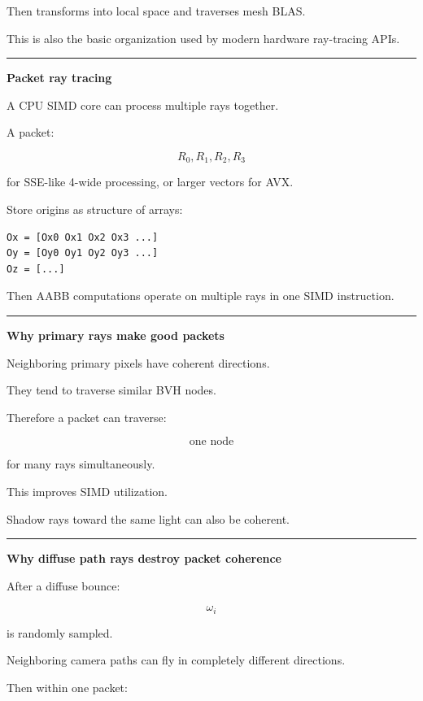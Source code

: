 Then transforms into local space and traverses mesh BLAS.

This is also the basic organization used by modern hardware ray-tracing APIs.

\begin{center}\rule{0.5\linewidth}{0.5pt}\end{center}

\textbf{Packet ray tracing}

A CPU SIMD core can process multiple rays together.

A packet:

\[
R_0,R_1,R_2,R_3
\]

for SSE-like 4-wide processing, or larger vectors for AVX.

Store origins as structure of arrays:

\begin{verbatim}
Ox = [Ox0 Ox1 Ox2 Ox3 ...]
Oy = [Oy0 Oy1 Oy2 Oy3 ...]
Oz = [...]
\end{verbatim}

Then AABB computations operate on multiple rays in one SIMD instruction.

\begin{center}\rule{0.5\linewidth}{0.5pt}\end{center}

\textbf{Why primary rays make good packets}

Neighboring primary pixels have coherent directions.

They tend to traverse similar BVH nodes.

Therefore a packet can traverse:

\[
\text{one node}
\]

for many rays simultaneously.

This improves SIMD utilization.

Shadow rays toward the same light can also be coherent.

\begin{center}\rule{0.5\linewidth}{0.5pt}\end{center}

\textbf{Why diffuse path rays destroy packet coherence}

After a diffuse bounce:

\[
\omega_i
\]

is randomly sampled.

Neighboring camera paths can fly in completely different directions.

Then within one packet:

